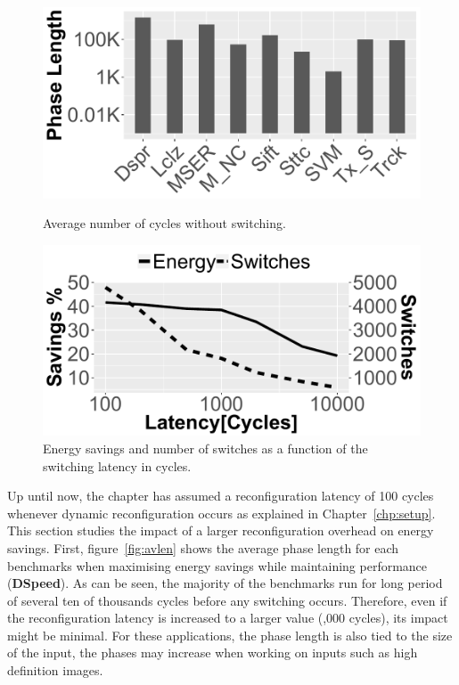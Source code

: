 \begin{figure}[t]
	\begin{minipage}{.5\textwidth}
	\includegraphics[width=.9\linewidth]{cases-paper/graphics/Exploration/condensed_clust.pdf}
    \caption{Average number of cycles without switching.}
    \label{fig:avlen}
	\end{minipage}%
	\begin{minipage}{.5\textwidth}
	\hfill
	\includegraphics[width=.9\linewidth]{cases-paper/graphics/Exploration/latency_2.pdf}
    \caption{Energy savings and number of switches as a function of the switching latency in cycles.}
    \label{fig:enlatency}
\end{minipage}
\vspace{5mm}
\end{figure}

Up until now, the chapter has assumed a reconfiguration latency of 100 cycles whenever dynamic reconfiguration occurs as explained in Chapter~\ref{chp:setup}.
This section studies the impact of a larger reconfiguration overhead on energy savings.
First, figure~\ref{fig:avlen} shows the average phase length for each benchmarks when maximising energy savings while maintaining performance (\textbf{DSpeed}).
As can be seen, the majority of the benchmarks run for long period of several ten of thousands cycles before any switching occurs.
Therefore, even if the reconfiguration latency is increased to a larger value (,000 cycles), its impact might be minimal.
For these applications, the phase length is also tied to the size of the input, the phases may increase when working on inputs such as high definition images.


